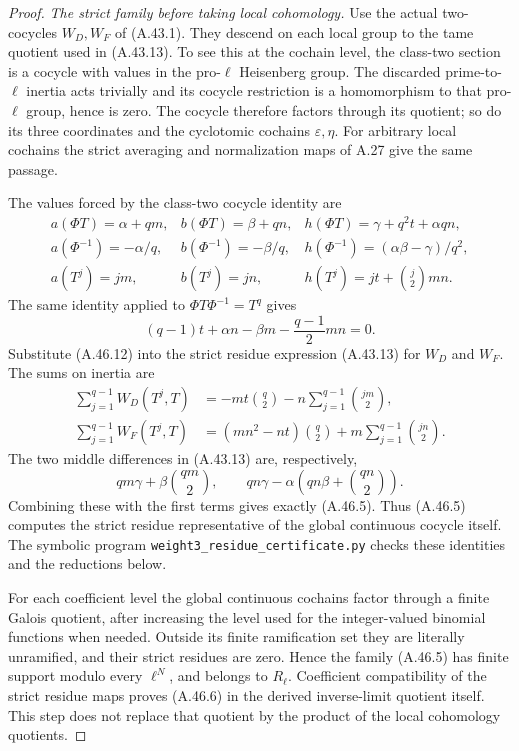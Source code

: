 \begin{proof}
\emph{The strict family before taking local cohomology.}
Use the actual two-cocycles $W_D,W_F$ of (A.43.1).
They descend on each local group to the tame quotient used
in (A.43.13).  To see this at the cochain level, the
class-two section is a cocycle with values in the pro-$\ell$
Heisenberg group.  The discarded prime-to-$\ell$ inertia
acts trivially and its cocycle restriction is a homomorphism
to that pro-$\ell$ group, hence is zero.  The cocycle
therefore factors through its quotient; so do its three
coordinates and the cyclotomic cochains $\varepsilon,\eta$.
For arbitrary local cochains the strict averaging and
normalization maps of A.27 give the same passage.

The values forced by the class-two cocycle identity are
\[
 \begin{array}{lll}
 a(\Phi T)=\alpha+qm,&
 b(\Phi T)=\beta+qn,&
 h(\Phi T)=\gamma+q^2t+\alpha qn,\\
 a(\Phi^{-1})=-\alpha/q,&
 b(\Phi^{-1})=-\beta/q,&
 h(\Phi^{-1})=(\alpha\beta-\gamma)/q^2,\\
 a(T^j)=jm,& b(T^j)=jn,&
 h(T^j)=jt+\binom j2mn.
 \end{array}
 \tag{A.46.12}
\]
The same identity applied to $\Phi T\Phi^{-1}=T^q$ gives
\[
 (q-1)t+\alpha n-\beta m-\frac{q-1}{2}mn=0.
 \tag{A.46.13}
\]
Substitute (A.46.12) into the strict residue expression
(A.43.13) for $W_D$ and $W_F$.  The sums on inertia are
\[
 \begin{split}
 \sum_{j=1}^{q-1}W_D(T^j,T)
       &=-mt\binom q2-n\sum_{j=1}^{q-1}\binom{jm}{2},\\
 \sum_{j=1}^{q-1}W_F(T^j,T)
       &=(mn^2-nt)\binom q2
                         +m\sum_{j=1}^{q-1}\binom{jn}{2}.
 \end{split}
\]
The two middle differences in (A.43.13) are, respectively,
\[
 qm\gamma+\beta\binom{qm}{2},\qquad
 qn\gamma-\alpha\left(qn\beta+\binom{qn}{2}\right).
\]
Combining these with the first terms gives exactly (A.46.5).
Thus (A.46.5) computes the strict residue representative of
the global continuous cocycle itself.  The symbolic program
\texttt{weight3\_residue\_certificate.py} checks these
identities and the reductions below.

For each coefficient level the global continuous cochains
factor through a finite Galois quotient, after increasing
the level used for the integer-valued binomial functions
when needed.  Outside its finite ramification set they
are literally unramified, and their strict residues are
zero.  Hence the family (A.46.5) has finite support modulo
every $\ell^N$, and belongs to $R_\ell$.
Coefficient compatibility of the strict residue maps proves
(A.46.6) in the derived inverse-limit quotient itself.
This step does not replace that quotient by the product
of the local cohomology quotients.


\end{proof}
